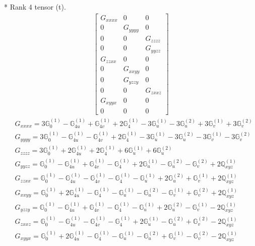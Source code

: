 \documentclass[fleqn,8pt,landscape]{jsarticle}
\begin{document}
* Rank 4 tensor (t).
\begin{align*}
\begin{bmatrix} G_{xxxx} & 0 & 0 \\ 0 & G_{yyyy} & 0 \\ 0 & 0 & G_{zzzz} \\ 0 & 0 & G_{yyzz} \\ G_{zzxx} & 0 & 0 \\ 0 & G_{xxyy} & 0 \\ 0 & G_{yzzy} & 0 \\ 0 & 0 & G_{zxxz} \\ G_{xyyx} & 0 & 0 \\ 0 & 0 & 0 \end{bmatrix}
\end{align*}
\begin{align*}
& G_{xxxx} = 3 \mathbb{G}_{0}^{(1)} - \mathbb{G}_{4u}^{(1)} + \mathbb{G}_{4v}^{(1)} + 2 \mathbb{G}_{4}^{(1)} - 3 \mathbb{G}_{u}^{(1)} - 3 \mathbb{G}_{u}^{(2)} + 3 \mathbb{G}_{v}^{(1)} + 3 \mathbb{G}_{v}^{(2)} \\
& G_{yyyy} = 3 \mathbb{G}_{0}^{(1)} - \mathbb{G}_{4u}^{(1)} - \mathbb{G}_{4v}^{(1)} + 2 \mathbb{G}_{4}^{(1)} - 3 \mathbb{G}_{u}^{(1)} - 3 \mathbb{G}_{u}^{(2)} - 3 \mathbb{G}_{v}^{(1)} - 3 \mathbb{G}_{v}^{(2)} \\
& G_{zzzz} = 3 \mathbb{G}_{0}^{(1)} + 2 \mathbb{G}_{4u}^{(1)} + 2 \mathbb{G}_{4}^{(1)} + 6 \mathbb{G}_{u}^{(1)} + 6 \mathbb{G}_{u}^{(2)} \\
& G_{yyzz} = \mathbb{G}_{0}^{(1)} - \mathbb{G}_{4u}^{(1)} + \mathbb{G}_{4v}^{(1)} - \mathbb{G}_{4}^{(1)} + 2 \mathbb{G}_{u}^{(1)} - \mathbb{G}_{u}^{(2)} - \mathbb{G}_{v}^{(2)} + 2 \mathbb{Q}_{xyz}^{(1)} \\
& G_{zzxx} = \mathbb{G}_{0}^{(1)} - \mathbb{G}_{4u}^{(1)} - \mathbb{G}_{4v}^{(1)} - \mathbb{G}_{4}^{(1)} - \mathbb{G}_{u}^{(1)} + 2 \mathbb{G}_{u}^{(2)} + \mathbb{G}_{v}^{(1)} + 2 \mathbb{Q}_{xyz}^{(1)} \\
& G_{xxyy} = \mathbb{G}_{0}^{(1)} + 2 \mathbb{G}_{4u}^{(1)} - \mathbb{G}_{4}^{(1)} - \mathbb{G}_{u}^{(1)} - \mathbb{G}_{u}^{(2)} - \mathbb{G}_{v}^{(1)} + \mathbb{G}_{v}^{(2)} + 2 \mathbb{Q}_{xyz}^{(1)} \\
& G_{yzzy} = \mathbb{G}_{0}^{(1)} - \mathbb{G}_{4u}^{(1)} + \mathbb{G}_{4v}^{(1)} - \mathbb{G}_{4}^{(1)} - \mathbb{G}_{u}^{(1)} + 2 \mathbb{G}_{u}^{(2)} - \mathbb{G}_{v}^{(1)} - 2 \mathbb{Q}_{xyz}^{(1)} \\
& G_{zxxz} = \mathbb{G}_{0}^{(1)} - \mathbb{G}_{4u}^{(1)} - \mathbb{G}_{4v}^{(1)} - \mathbb{G}_{4}^{(1)} + 2 \mathbb{G}_{u}^{(1)} - \mathbb{G}_{u}^{(2)} + \mathbb{G}_{v}^{(2)} - 2 \mathbb{Q}_{xyz}^{(1)} \\
& G_{xyyx} = \mathbb{G}_{0}^{(1)} + 2 \mathbb{G}_{4u}^{(1)} - \mathbb{G}_{4}^{(1)} - \mathbb{G}_{u}^{(1)} - \mathbb{G}_{u}^{(2)} + \mathbb{G}_{v}^{(1)} - \mathbb{G}_{v}^{(2)} - 2 \mathbb{Q}_{xyz}^{(1)}
\end{align*}
\end{document}
